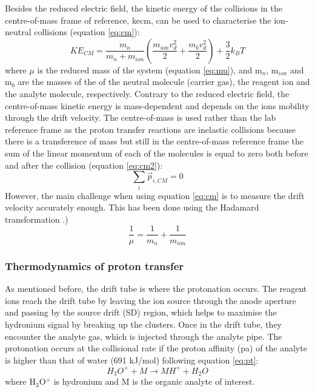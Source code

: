 Besides the reduced electric field, the kinetic energy of the collisions in the centre-of-mass frame of reference, \acrshort{kecm}, can be used to characterise the ion-neutral collisions (equation \ref{eq:cm}):
\begin{equation}
\label{eq:cm}
KE_{CM} = \frac{m_n}{m_n + m_{ion}} \left( \frac{m_{ion}v_d^2}{2} + \frac{m_{b}v_d^2}{2}\right) + \frac{3}{2}k_BT
\end{equation}
where $\mu$ is the reduced mass of the system (equation \ref{eq:mu}), and m$_n$, m$_{ion}$ and m$_b$ are the masses of the of the neutral molecule (carrier gas), the reagent ion and the analyte molecule, respectively. Contrary to the reduced electric field, the centre-of-mass kinetic energy is mass-dependent and depends on the ions mobility through the drift velocity. The centre-of-mass is used rather than the lab reference frame as the proton transfer reactions are inelastic collisions because there is a transference of mass but still in the centre-of-mass reference frame the sum of the linear momentum of each of the molecules is equal to zero both before and after the collision (equation \ref{eq:cm2}):
\begin{equation}
\label{eq:cm2}
\sum_i \vec{p}_{i,CM} = 0
\end{equation}
However, the main challenge when using equation \ref{eq:cm} is to measure the drift velocity accurately enough. This has been done using the Hadamard transformation \cite{doi:10.1002/rcm.7254}.)
\begin{equation}
\label{eq:mu}
\frac{1}{\mu} = \frac{1}{m_n} + \frac{1}{m_{ion}}
\end{equation}

\subsubsection{Thermodynamics of proton transfer}
As mentioned before, the drift tube is where the protonation occurs. The reagent ions reach the drift tube by leaving the ion source through the anode aperture and passing by the source drift (SD) region, which helps to maximise the hydronium signal by breaking up the clusters. Once in the drift tube, they encounter the analyte gas, which is injected through the analyte pipe. The protonation occurs at the collisional rate if the proton affinity (\acrshort{pa}) of the analyte is higher than that of water (691 kJ/mol) following equation \ref{eq:pt}:
\begin{equation}
\label{eq:pt}
H_3O^+ + M \rightarrow MH^+ + H_2O
\end{equation}
where H$_3$O$^+$ is hydronium and M is the organic analyte of interest. 

